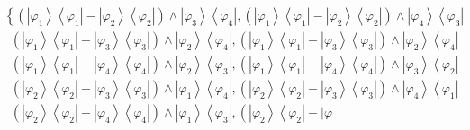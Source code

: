 \documentclass[aps,preprint]{revtex4}%
\begin{document}
\begin{align}
&  \left\{  \left(  \left\vert \varphi_{1}\right\rangle \left\langle
\varphi_{1}\right\vert -\left\vert \varphi_{2}\right\rangle \left\langle
\varphi_{2}\right\vert \right)  \wedge\left\vert \varphi_{3}\right\rangle
\left\langle \varphi_{4}\right\vert ,\left(  \left\vert \varphi_{1}%
\right\rangle \left\langle \varphi_{1}\right\vert -\left\vert \varphi
_{2}\right\rangle \left\langle \varphi_{2}\right\vert \right)  \wedge
\left\vert \varphi_{4}\right\rangle \left\langle \varphi_{3}\right\vert
\right. \nonumber\\
&  \,\,\,\left(  \left\vert \varphi_{1}\right\rangle \left\langle \varphi
_{1}\right\vert -\left\vert \varphi_{3}\right\rangle \left\langle \varphi
_{3}\right\vert \right)  \wedge\left\vert \varphi_{2}\right\rangle
\left\langle \varphi_{4}\right\vert ,\left(  \left\vert \varphi_{1}%
\right\rangle \left\langle \varphi_{1}\right\vert -\left\vert \varphi
_{3}\right\rangle \left\langle \varphi_{3}\right\vert \right)  \wedge
\left\vert \varphi_{2}\right\rangle \left\langle \varphi_{4}\right\vert
\nonumber\\
&  \,\,\,\left(  \left\vert \varphi_{1}\right\rangle \left\langle \varphi
_{1}\right\vert -\left\vert \varphi_{4}\right\rangle \left\langle \varphi
_{4}\right\vert \right)  \wedge\left\vert \varphi_{2}\right\rangle
\left\langle \varphi_{3}\right\vert ,\left(  \left\vert \varphi_{1}%
\right\rangle \left\langle \varphi_{1}\right\vert -\left\vert \varphi
_{4}\right\rangle \left\langle \varphi_{4}\right\vert \right)  \wedge
\left\vert \varphi_{3}\right\rangle \left\langle \varphi_{2}\right\vert
\nonumber\\
&  \,\,\,\left(  \left\vert \varphi_{2}\right\rangle \left\langle \varphi
_{2}\right\vert -\left\vert \varphi_{3}\right\rangle \left\langle \varphi
_{3}\right\vert \right)  \wedge\left\vert \varphi_{1}\right\rangle
\left\langle \varphi_{4}\right\vert ,\left(  \left\vert \varphi_{2}%
\right\rangle \left\langle \varphi_{2}\right\vert -\left\vert \varphi
_{3}\right\rangle \left\langle \varphi_{3}\right\vert \right)  \wedge
\left\vert \varphi_{4}\right\rangle \left\langle \varphi_{1}\right\vert
\nonumber\\
&  \,\,\,\left(  \left\vert \varphi_{2}\right\rangle \left\langle \varphi
_{2}\right\vert -\left\vert \varphi_{4}\right\rangle \left\langle \varphi
_{4}\right\vert \right)  \wedge\left\vert \varphi_{1}\right\rangle
\left\langle \varphi_{3}\right\vert ,\left(  \left\vert \varphi_{2}%
\right\rangle \left\langle \varphi_{2}\right\vert -\left\vert \varphi

\end{align}
\end{document}
